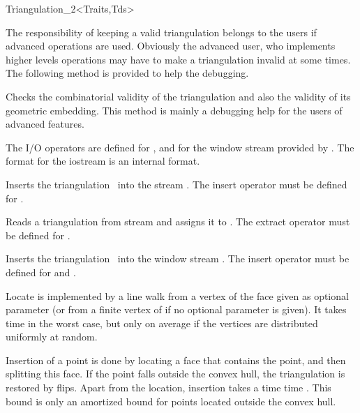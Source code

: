 \begin{ccRefClass}{Triangulation_2<Traits,Tds>}
\begin{ccAdvanced}
The responsibility of keeping a valid triangulation
belongs to the users if advanced operations are used.
Obviously the advanced user, who implements higher levels operations
may have to make a triangulation invalid at some times. The following
method is provided to help the debugging.

{Checks the combinatorial validity of the triangulation and
also the validity of its geometric embedding.
 This method is  mainly a debugging help
for the users of advanced features.
}
\end{ccAdvanced}




The I/O operators are defined for , and for
the window stream provided by \cgal. The format for the iostream
is an internal format. 


{Inserts the triangulation \ccVar\ into the stream .
\ccPrecond The insert operator must be defined for .}

{Reads a triangulation from stream  and assigns it
to \ccVar. \ccPrecond The extract operator must be defined for .}


{Inserts the triangulation \ccVar\ into the window stream .
The insert operator must be defined for 
and .}



Locate is implemented by a line walk from a vertex of the face given
as optional parameter (or from a finite vertex of
 if no optional parameter is given). It takes
time  in the worst case, but only 
on average if the vertices are distributed uniformly at random.

Insertion of a point is done by locating a face that contains the
point, and then splitting this face.
If the point falls outside the convex hull, the triangulation
 is restored by flips.  Apart from the location, insertion takes a time 
time . This bound is only an amortized bound
for points located outside the convex hull.


\end{ccRefClass}
